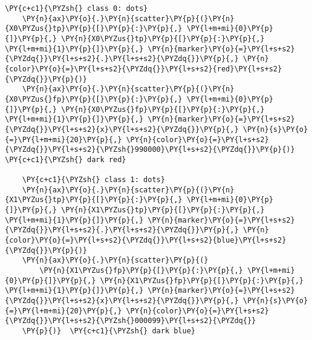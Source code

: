 \begin{Verbatim}[commandchars=\\\{\}]
    \PY{c+c1}{\PYZsh{} class 0: dots}
    \PY{n}{ax}\PY{o}{.}\PY{n}{scatter}\PY{p}{(}\PY{n}{X0\PYZus{}tp}\PY{p}{[}\PY{p}{:}\PY{p}{,} \PY{l+m+mi}{0}\PY{p}{]}\PY{p}{,} \PY{n}{X0\PYZus{}tp}\PY{p}{[}\PY{p}{:}\PY{p}{,} \PY{l+m+mi}{1}\PY{p}{]}\PY{p}{,} \PY{n}{marker}\PY{o}{=}\PY{l+s+s2}{\PYZdq{}}\PY{l+s+s2}{.}\PY{l+s+s2}{\PYZdq{}}\PY{p}{,} \PY{n}{color}\PY{o}{=}\PY{l+s+s2}{\PYZdq{}}\PY{l+s+s2}{red}\PY{l+s+s2}{\PYZdq{}}\PY{p}{)}
    \PY{n}{ax}\PY{o}{.}\PY{n}{scatter}\PY{p}{(}\PY{n}{X0\PYZus{}fp}\PY{p}{[}\PY{p}{:}\PY{p}{,} \PY{l+m+mi}{0}\PY{p}{]}\PY{p}{,} \PY{n}{X0\PYZus{}fp}\PY{p}{[}\PY{p}{:}\PY{p}{,} \PY{l+m+mi}{1}\PY{p}{]}\PY{p}{,} \PY{n}{marker}\PY{o}{=}\PY{l+s+s2}{\PYZdq{}}\PY{l+s+s2}{x}\PY{l+s+s2}{\PYZdq{}}\PY{p}{,} \PY{n}{s}\PY{o}{=}\PY{l+m+mi}{20}\PY{p}{,} \PY{n}{color}\PY{o}{=}\PY{l+s+s2}{\PYZdq{}}\PY{l+s+s2}{\PYZsh{}990000}\PY{l+s+s2}{\PYZdq{}}\PY{p}{)}  \PY{c+c1}{\PYZsh{} dark red}

    \PY{c+c1}{\PYZsh{} class 1: dots}
    \PY{n}{ax}\PY{o}{.}\PY{n}{scatter}\PY{p}{(}\PY{n}{X1\PYZus{}tp}\PY{p}{[}\PY{p}{:}\PY{p}{,} \PY{l+m+mi}{0}\PY{p}{]}\PY{p}{,} \PY{n}{X1\PYZus{}tp}\PY{p}{[}\PY{p}{:}\PY{p}{,} \PY{l+m+mi}{1}\PY{p}{]}\PY{p}{,} \PY{n}{marker}\PY{o}{=}\PY{l+s+s2}{\PYZdq{}}\PY{l+s+s2}{.}\PY{l+s+s2}{\PYZdq{}}\PY{p}{,} \PY{n}{color}\PY{o}{=}\PY{l+s+s2}{\PYZdq{}}\PY{l+s+s2}{blue}\PY{l+s+s2}{\PYZdq{}}\PY{p}{)}
    \PY{n}{ax}\PY{o}{.}\PY{n}{scatter}\PY{p}{(}
        \PY{n}{X1\PYZus{}fp}\PY{p}{[}\PY{p}{:}\PY{p}{,} \PY{l+m+mi}{0}\PY{p}{]}\PY{p}{,} \PY{n}{X1\PYZus{}fp}\PY{p}{[}\PY{p}{:}\PY{p}{,} \PY{l+m+mi}{1}\PY{p}{]}\PY{p}{,} \PY{n}{marker}\PY{o}{=}\PY{l+s+s2}{\PYZdq{}}\PY{l+s+s2}{x}\PY{l+s+s2}{\PYZdq{}}\PY{p}{,} \PY{n}{s}\PY{o}{=}\PY{l+m+mi}{20}\PY{p}{,} \PY{n}{color}\PY{o}{=}\PY{l+s+s2}{\PYZdq{}}\PY{l+s+s2}{\PYZsh{}000099}\PY{l+s+s2}{\PYZdq{}}
    \PY{p}{)}  \PY{c+c1}{\PYZsh{} dark blue}


\end{Verbatim}
